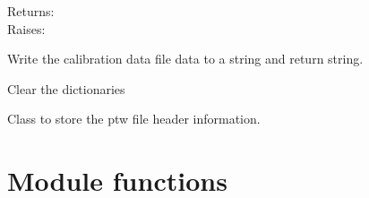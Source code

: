 \documentclass[a4paper,10pt,english]{sphinxmanual}
\begin{document}
\begin{fulllineitems}
\begin{fulllineitems}
\begin{description}
\item[{Returns:}] \leavevmode
{}

\item[{Raises:}] \leavevmode
{}

\end{description}

\end{fulllineitems}


\begin{fulllineitems}
\label{ryptw:pyradi.ryptw.JadeCalibrationData.info}
Write the calibration data file data to a string and return string.

\end{fulllineitems}


\begin{fulllineitems}
\label{ryptw:pyradi.ryptw.JadeCalibrationData.resetDict}
Clear the dictionaries

\end{fulllineitems}


\end{fulllineitems}


\begin{fulllineitems}
\label{ryptw:pyradi.ryptw.PTWFrameInfo}
Class to store the ptw file header information.

\end{fulllineitems}



\section{Module functions}
\label{ryptw:module-functions}
\end{document}
